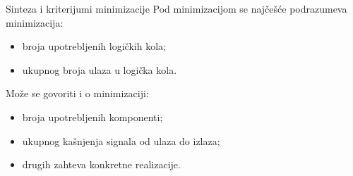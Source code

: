 \begin{frame}[label=02-s007]{Sinteza i kriterijumi minimizacije}
Pod \alert{minimizacijom} se najčešće podrazumeva minimizacija:
\par\vspace{3mm}
\begin{itemize}
\item broja upotrebljenih logičkih kola;
\item ukupnog broja ulaza u logička kola.
\end{itemize}
\par\vspace{5mm}
Može se govoriti i o minimizaciji:
\par\vspace{3mm}
\begin{itemize}
\item broja upotrebljenih \alert{komponenti};
\item ukupnog kašnjenja signala od ulaza do izlaza;
\item drugih zahteva konkretne realizacije.
\end{itemize}
\end{frame}

